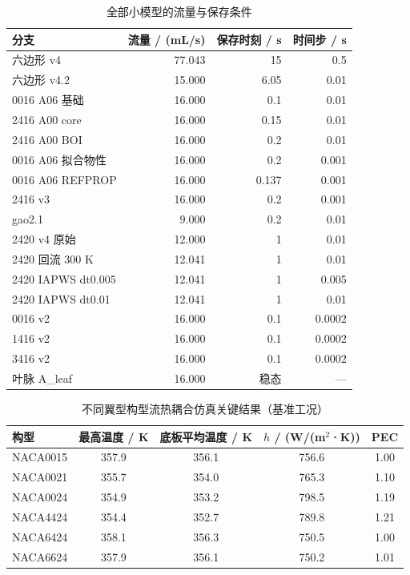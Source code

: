 \documentclass[stage2,fontset=fandol]{ydzjreport}
\begin{document}
\clearpage
\setcounter{table}{6}
\begin{table}[H]\centering\small
\caption{全部小模型的流量与保存条件}\label{tab:other-conditions}
\begin{tabularx}{\textwidth}{@{}Y r r r@{}}
\toprule
{} 分支 & 流量 / (mL/s) & 保存时刻 / s & 时间步 / s \\
\midrule
六边形 v4 & 77.043 & 15 & 0.5 \\
六边形 v4.2 & 15.000 & 6.05 & 0.01 \\
0016 A06 基础 & 16.000 & 0.1 & 0.01 \\
2416 A00 core & 16.000 & 0.15 & 0.01 \\
2416 A00 BOI & 16.000 & 0.2 & 0.01 \\
0016 A06 拟合物性 & 16.000 & 0.2 & 0.001 \\
0016 A06 REFPROP & 16.000 & 0.137 & 0.001 \\
2416 v3 & 16.000 & 0.2 & 0.001 \\
gao2.1 & 9.000 & 0.2 & 0.01 \\
2420 v4 原始 & 12.000 & 1 & 0.01 \\
2420 回流 300 K & 12.041 & 1 & 0.01 \\
2420 IAPWS dt0.005 & 12.041 & 1 & 0.005 \\
2420 IAPWS dt0.01 & 12.041 & 1 & 0.01 \\
0016 v2 & 16.000 & 0.1 & 0.0002 \\
1416 v2 & 16.000 & 0.1 & 0.0002 \\
3416 v2 & 16.000 & 0.1 & 0.0002 \\
叶脉 A\_leaf & 16.000 & 稳态 & --- \\
\bottomrule
\end{tabularx}
\end{table}
\clearpage
\setcounter{table}{7}
\begin{table}[H]
\centering
\caption{不同翼型构型流热耦合仿真关键结果（基准工况）}
\label{tab:airfoil-overview}
\begin{tabularx}{\textwidth}{@{}l c c c c@{}}
\toprule
\rowcolor{ydzjlight} 构型 & 最高温度 / K & 底板平均温度 / K & $h$ / (W/(m$^2$·K)) & PEC \\
\midrule
NACA0015 & 357.9 & 356.1 & 756.6 & 1.00 \\
NACA0021 & 355.7 & 354.0 & 765.3 & 1.10 \\
NACA0024 & 354.9 & 353.2 & 798.5 & 1.19 \\
NACA4424 & 354.4 & 352.7 & 789.8 & 1.21 \\
NACA6424 & 358.1 & 356.3 & 750.5 & 1.00 \\
NACA6624 & 357.9 & 356.1 & 750.2 & 1.01 \\
\bottomrule
\end{tabularx}
\end{table}
\end{document}
